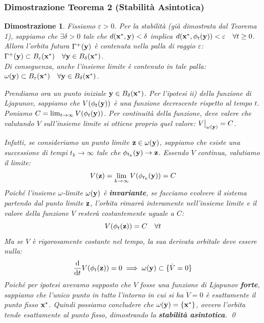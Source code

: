 \documentclass[openany]{book}
\newtheorem*{dimostrazione}{Dimostrazione}
\theoremstyle{definition}
\theoremstyle{remark}
\begin{document}
\subsubsection*{Dimostrazione Teorema 2 (Stabilità Asintotica)}
\begin{dimostrazione}
Fissiamo $\varepsilon > 0$. Per la stabilità (già dimostrata dal Teorema 1), sappiamo che $\exists \delta > 0$ tale che $d(\vb{x}^*, \vb{y}) < \delta$ implica $d(\vb{x}^*, \phi_t(\vb{y})) < \varepsilon \quad \forall t \ge 0$. \\
Allora l'orbita futura $\Gamma^+(\vb{y})$ è contenuta nella palla di raggio $\varepsilon$: $\Gamma^+(\vb{y}) \subset B_\varepsilon(\vb{x}^*) \quad \forall \vb{y} \in B_\delta(\vb{x}^*)$. \\
Di conseguenza, anche l'insieme limite è contenuto in tale palla: $\omega(\vb{y}) \subset B_\varepsilon(\vb{x}^*) \quad \forall \vb{y} \in B_\delta(\vb{x}^*)$.

Prendiamo ora un punto iniziale $\vb{y} \in B_\delta(\vb{x}^*)$. Per l'ipotesi ii) della funzione di Ljapunov, sappiamo che $V(\phi_t(\vb{y}))$ è una funzione decrescente rispetto al tempo $t$.
Poniamo $C = \lim_{t \to \infty} V(\phi_t(\vb{y}))$. Per continuità della funzione, deve valere che valutando $V$ sull'insieme limite si ottiene proprio quel valore: $V\big|_{\omega(\vb{y})} = C$.

Infatti, se consideriamo un punto limite $\vb{z} \in \omega(\vb{y})$, sappiamo che esiste una successione di tempi $t_k \to \infty$ tale che $\phi_{t_k}(\vb{y}) \to \vb{z}$.
Essendo $V$ continua, valutiamo il limite:
\begin{equation*}
    V(\vb{z}) = \lim_{k \to \infty} V(\phi_{t_k}(\vb{y})) = C
\end{equation*}
Poiché l'insieme $\omega$-limite $\omega(\vb{y})$ è \textbf{invariante}, se facciamo evolvere il sistema partendo dal punto limite $\vb{z}$, l'orbita rimarrà interamente nell'insieme limite e il valore della funzione $V$ resterà costantemente uguale a $C$:
\begin{equation*}
    V(\phi_t(\vb{z})) = C \quad \forall t
\end{equation*}
Ma se $V$ è rigorosamente costante nel tempo, la sua derivata orbitale deve essere nulla:
\begin{equation*}
    \dv{t} V(\phi_t(\vb{z})) = 0 \implies \omega(\vb{y}) \subset \{ \dot{V} = 0 \}
\end{equation*}
Poiché per ipotesi avevamo supposto che $V$ fosse una funzione di Ljapunov \textbf{forte}, sappiamo che l'unico punto in tutto l'intorno in cui si ha $\dot{V} = 0$ è esattamente il punto fisso $\vb{x}^*$.
Quindi possiamo concludere che $\omega(\vb{y}) = \{\vb{x}^*\}$, ovvero l'orbita tende esattamente al punto fisso, dimostrando la \textbf{stabilità asintotica}. \qed
\end{dimostrazione}
\end{document}
